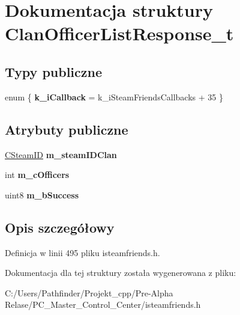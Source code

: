 \hypertarget{struct_clan_officer_list_response__t}{}\section{Dokumentacja struktury Clan\+Officer\+List\+Response\+\_\+t}
\label{struct_clan_officer_list_response__t}
\subsection*{Typy publiczne}
\begin{DoxyCompactItemize}
\item 
\mbox{\label{struct_clan_officer_list_response__t_abae95d2f6370230f8e45aafbb0381ba2}} 
enum \{ {\bfseries k\+\_\+i\+Callback} = k\+\_\+i\+Steam\+Friends\+Callbacks + 35
 \}
\end{DoxyCompactItemize}
\subsection*{Atrybuty publiczne}
\begin{DoxyCompactItemize}
\item 
\mbox{\label{struct_clan_officer_list_response__t_a20db8f1d370f8e8a6dea6f19c2d4b209}} 
\hyperlink{class_c_steam_i_d}{C\+Steam\+ID} {\bfseries m\+\_\+steam\+I\+D\+Clan}
\item 
\mbox{\label{struct_clan_officer_list_response__t_a6fc80fb07a22f732d96a936413cf721c}} 
int {\bfseries m\+\_\+c\+Officers}
\item 
\mbox{\label{struct_clan_officer_list_response__t_a8aae147142a62f19731d46cd944bf2e9}} 
uint8 {\bfseries m\+\_\+b\+Success}
\end{DoxyCompactItemize}


\subsection{Opis szczegółowy}


Definicja w linii 495 pliku isteamfriends.\+h.



Dokumentacja dla tej struktury została wygenerowana z pliku\+:\begin{DoxyCompactItemize}
\item 
C\+:/\+Users/\+Pathfinder/\+Projekt\+\_\+cpp/\+Pre-\/\+Alpha Relase/\+P\+C\+\_\+\+Master\+\_\+\+Control\+\_\+\+Center/isteamfriends.\+h\end{DoxyCompactItemize}
